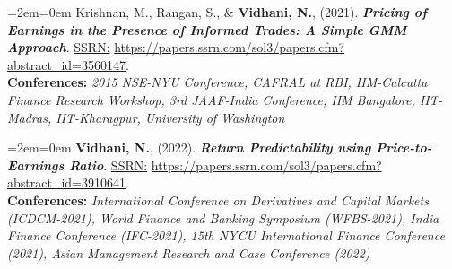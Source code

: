 \documentclass[11pt,a4paper,]{moderncv}
\begin{document}
\bgroup %
  \par%
  \medskip
  \leftskip=2em\rightskip=0em%
  \noindent\ignorespaces
Krishnan, M., Rangan, S., \& \textbf{Vidhani, N.}, (2021). \textbf{\textit{Pricing of Earnings in the Presence of Informed Trades: A Simple GMM Approach}}. \underline{SSRN:} \url{https://papers.ssrn.com/sol3/papers.cfm?abstract_id=3560147}.\\
\textbf{Conferences:} \textit{2015 NSE-NYU Conference, CAFRAL at RBI, IIM-Calcutta Finance Research Workshop, 3rd JAAF-India Conference, IIM Bangalore, IIT-Madras, IIT-Kharagpur, University of Washington}\\
%
  \par\medskip\egroup

\bgroup %
  \par%
  \medskip
  \leftskip=2em\rightskip=0em%
  \noindent\ignorespaces
\textbf{Vidhani, N.}, (2022). \textbf{\textit{Return Predictability using
Price-to-Earnings Ratio}}. \underline{SSRN:} \url{https://papers.ssrn.com/sol3/papers.cfm?abstract_id=3910641}.\\
\textbf{Conferences:} \textit{International Conference on Derivatives and Capital Markets (ICDCM-2021), World Finance and Banking Symposium (WFBS-2021), India Finance Conference (IFC-2021), 15th NYCU International Finance Conference (2021), Asian Management Research and Case Conference (2022)}\\
%
  \par\medskip\egroup

\endgroup
\end{document}
